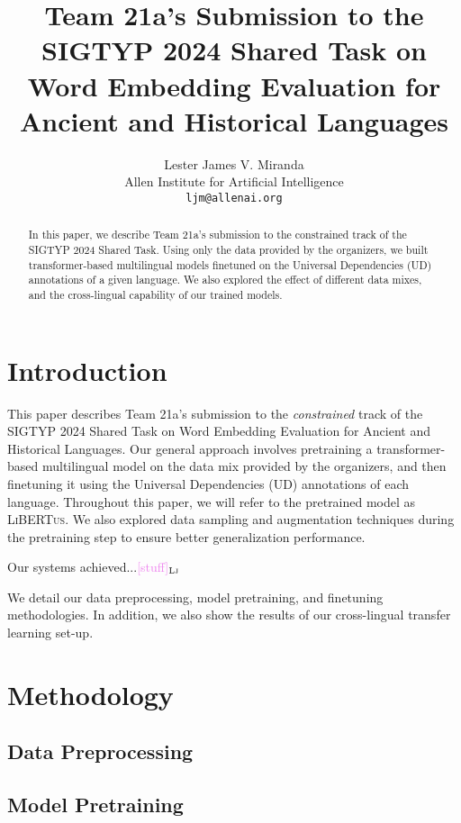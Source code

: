 \documentclass[11pt]{article}
\title{Team 21a's Submission to the SIGTYP 2024 Shared Task on Word Embedding Evaluation for Ancient and Historical Languages}
\author{Lester James V. Miranda \\
  Allen Institute for Artificial Intelligence \\
  \texttt{ljm@allenai.org} \\
}
\newcommand{\draftonly}[1]{#1}
\newcommand{\draftcomment}[3]{\draftonly{\textcolor{#2}{[#3]{$_{\textsc{#1}}$}}}}
\newcommand{\lj}[1]{\draftcomment{Lj}{violet}{#1}}
\newcommand{\libertus}{\textsc{LiBERTus}}
\begin{document}
\maketitle

\begin{abstract}
In this paper, we describe Team 21a's submission to the constrained track of the SIGTYP 2024 Shared Task.
Using only the data provided by the organizers, we built transformer-based multilingual models finetuned on the Universal Dependencies (UD) annotations of a given language.
We also explored the effect of different data mixes, and the cross-lingual capability of our trained models.
\end{abstract}

\section{Introduction}
This paper describes Team 21a's submission to the \textit{constrained} track of the SIGTYP 2024 Shared Task on Word Embedding Evaluation for Ancient and Historical Languages.
Our general approach involves pretraining a transformer-based multilingual model on the data mix provided by the organizers, and then finetuning it using the Universal Dependencies (UD) annotations of each language.
Throughout this paper, we will refer to the pretrained model as \libertus{}.
We also explored data sampling and augmentation techniques during the pretraining step to ensure better generalization performance.

Our systems achieved...\lj{stuff}

We detail our data preprocessing, model pretraining, and finetuning methodologies.
In addition, we also show the results of our cross-lingual transfer learning set-up.

\section{Methodology}

% 
% 


\subsection{Data Preprocessing}


\subsection{Model Pretraining}
\end{document}
